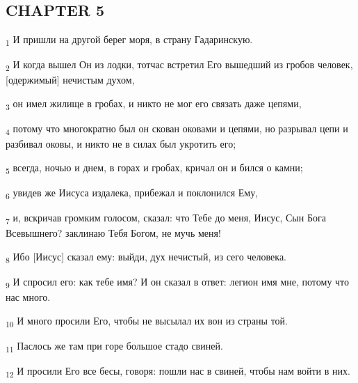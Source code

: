 \subsection{CHAPTER 5}
\begin{tcolorbox}
\textsubscript{1} И пришли на другой берег моря, в страну Гадаринскую.
\end{tcolorbox}
\begin{tcolorbox}
\textsubscript{2} И когда вышел Он из лодки, тотчас встретил Его вышедший из гробов человек, [одержимый] нечистым духом,
\end{tcolorbox}
\begin{tcolorbox}
\textsubscript{3} он имел жилище в гробах, и никто не мог его связать даже цепями,
\end{tcolorbox}
\begin{tcolorbox}
\textsubscript{4} потому что многократно был он скован оковами и цепями, но разрывал цепи и разбивал оковы, и никто не в силах был укротить его;
\end{tcolorbox}
\begin{tcolorbox}
\textsubscript{5} всегда, ночью и днем, в горах и гробах, кричал он и бился о камни;
\end{tcolorbox}
\begin{tcolorbox}
\textsubscript{6} увидев же Иисуса издалека, прибежал и поклонился Ему,
\end{tcolorbox}
\begin{tcolorbox}
\textsubscript{7} и, вскричав громким голосом, сказал: что Тебе до меня, Иисус, Сын Бога Всевышнего? заклинаю Тебя Богом, не мучь меня!
\end{tcolorbox}
\begin{tcolorbox}
\textsubscript{8} Ибо [Иисус] сказал ему: выйди, дух нечистый, из сего человека.
\end{tcolorbox}
\begin{tcolorbox}
\textsubscript{9} И спросил его: как тебе имя? И он сказал в ответ: легион имя мне, потому что нас много.
\end{tcolorbox}
\begin{tcolorbox}
\textsubscript{10} И много просили Его, чтобы не высылал их вон из страны той.
\end{tcolorbox}
\begin{tcolorbox}
\textsubscript{11} Паслось же там при горе большое стадо свиней.
\end{tcolorbox}
\begin{tcolorbox}
\textsubscript{12} И просили Его все бесы, говоря: пошли нас в свиней, чтобы нам войти в них.
\end{tcolorbox}
